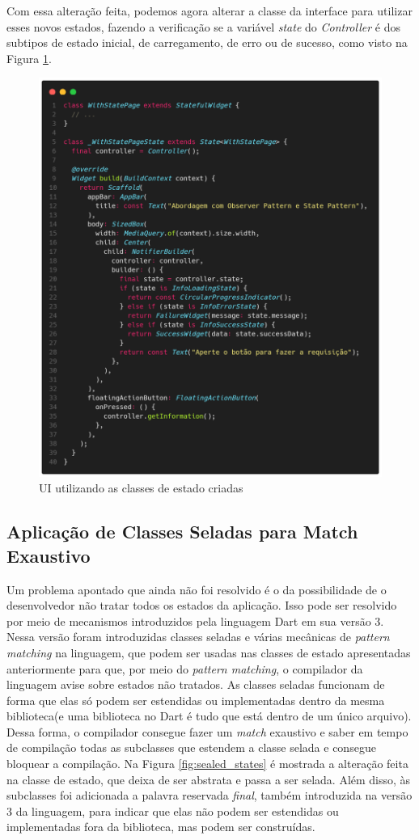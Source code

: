 \documentclass[12pt, %
openright, 
oneside, %
a4paper,    %
brazil]{facom-ufu-abntex2}
\begin{document}
Com essa alteração feita, podemos agora alterar a classe da interface para utilizar esses novos estados, fazendo a verificação se a variável \textit{state} do \textit{Controller} é dos subtipos de estado inicial, de carregamento, de erro ou de sucesso, como visto na Figura \ref{fig:with_state_page}.

\begin{figure}[ht]
    \centering
    \includegraphics[width=.65\textwidth, trim={0 30 0 100}, clip]{figures/states/with_state_page.png}
    \caption{UI utilizando as classes de estado criadas}
    \label{fig:with_state_page}
\end{figure}

\subsection{Aplicação de Classes Seladas para Match Exaustivo}

Um problema apontado que ainda não foi resolvido é o da possibilidade de o desenvolvedor não tratar todos os estados da aplicação. Isso pode ser resolvido por meio de mecanismos introduzidos pela linguagem Dart em sua versão 3. Nessa versão foram introduzidas classes seladas e várias mecânicas de \textit{pattern matching} na linguagem, que podem ser usadas nas classes de estado apresentadas anteriormente para que, por meio do \textit{pattern matching}, o compilador da linguagem avise sobre estados não tratados. As classes seladas funcionam de forma que elas só podem ser estendidas ou implementadas dentro da mesma biblioteca(e uma biblioteca no Dart é tudo que está dentro de um único arquivo). Dessa forma, o compilador consegue fazer um \textit{match} exaustivo e saber em tempo de compilação todas as subclasses que estendem a classe selada e consegue bloquear a compilação. Na Figura \ref{fig:sealed_states} é mostrada a alteração feita na classe de estado, que deixa de ser abstrata e passa a ser selada. Além disso, às subclasses foi adicionada a palavra reservada \textit{final}, também introduzida na versão 3 da linguagem, para indicar que elas não podem ser estendidas ou implementadas fora da biblioteca, mas podem ser construídas.
\end{document}
